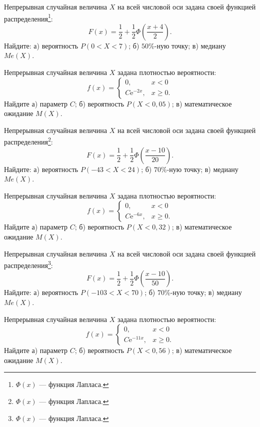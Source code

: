 \vfill

\newpage\setcounter{zad}{0}

\z Непрерывная случайная величина $X$ на всей числовой оси задана своей функцией распределения\footnote{$\Phi(x)$ --- функция Лапласа.}: $$ F(x) = \frac{1}{2} + \frac{1}{2}\Phi\left( \frac{x + 4}{2} \right). $$ Найдите: а) вероятность $P(0 < X < 7)$; б) $50\%$-ную точку; в) медиану $Me(X)$.


\vfill

\z Непрерывная случайная величина $X$ задана плотностью вероятности: $$ f(x) = \begin{cases}0, & x < 0 \\ C\mathrm{e}^{-2x}, & x \geqslant 0.\end{cases} $$ Найдите а) параметр $C$; б) вероятность $P(X < 0{,}05)$; в) математическое ожидание $M(X)$.
 

\vfill

\newpage\setcounter{zad}{0}

\z Непрерывная случайная величина $X$ на всей числовой оси задана своей функцией распределения\footnote{$\Phi(x)$ --- функция Лапласа.}: $$ F(x) = \frac{1}{2} + \frac{1}{2}\Phi\left( \frac{x - 10}{20} \right). $$ Найдите: а) вероятность $P(-43 < X < 24)$; б) $70\%$-ную точку; в) медиану $Me(X)$.


\vfill

\z Непрерывная случайная величина $X$ задана плотностью вероятности: $$ f(x) = \begin{cases}0, & x < 0 \\ C\mathrm{e}^{-6x}, & x \geqslant 0.\end{cases} $$ Найдите а) параметр $C$; б) вероятность $P(X < 0{,}32)$; в) математическое ожидание $M(X)$.
 

\vfill

\newpage\setcounter{zad}{0}

\z Непрерывная случайная величина $X$ на всей числовой оси задана своей функцией распределения\footnote{$\Phi(x)$ --- функция Лапласа.}: $$ F(x) = \frac{1}{2} + \frac{1}{2}\Phi\left( \frac{x - 10}{50} \right). $$ Найдите: а) вероятность $P(-103 < X < 70)$; б) $70\%$-ную точку; в) медиану $Me(X)$.


\vfill

\z Непрерывная случайная величина $X$ задана плотностью вероятности: $$ f(x) = \begin{cases}0, & x < 0 \\ C\mathrm{e}^{-11x}, & x \geqslant 0.\end{cases} $$ Найдите а) параметр $C$; б) вероятность $P(X < 0{,}56)$; в) математическое ожидание $M(X)$.
 

\vfill

\newpage\setcounter{zad}{0}